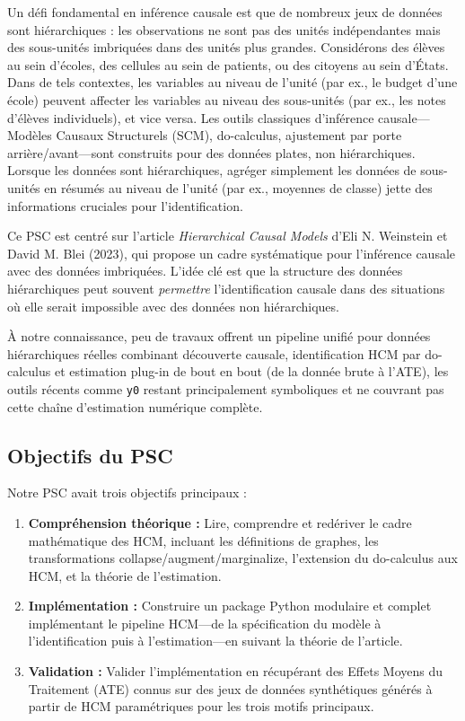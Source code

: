 \documentclass[11pt,a4paper]{article}
\begin{document}
Un défi fondamental en inférence causale est que de nombreux jeux de données sont hiérarchiques : les observations ne sont pas des unités indépendantes mais des sous-unités imbriquées dans des unités plus grandes.
Considérons des élèves au sein d'écoles, des cellules au sein de patients, ou des citoyens au sein d'États.
Dans de tels contextes, les variables au niveau de l'unité (par ex., le budget d'une école) peuvent affecter les variables au niveau des sous-unités (par ex., les notes d'élèves individuels), et vice versa.
Les outils classiques d'inférence causale---Modèles Causaux Structurels (SCM), do-calculus, ajustement par porte arrière/avant---sont construits pour des données plates, non hiérarchiques.
Lorsque les données sont hiérarchiques, agréger simplement les données de sous-unités en résumés au niveau de l'unité (par ex., moyennes de classe) jette des informations cruciales pour l'identification.

Ce PSC est centré sur l'article \emph{Hierarchical Causal Models} d'Eli N. Weinstein et David M. Blei (2023), qui propose un cadre systématique pour l'inférence causale avec des données imbriquées.
L'idée clé est que la structure des données hiérarchiques peut souvent \emph{permettre} l'identification causale dans des situations où elle serait impossible avec des données non hiérarchiques.

À notre connaissance, peu de travaux offrent un pipeline unifié pour données hiérarchiques réelles combinant découverte causale, identification HCM par do-calculus et estimation plug-in de bout en bout (de la donnée brute à l'ATE), les outils récents comme \texttt{y0} restant principalement symboliques et ne couvrant pas cette chaîne d'estimation numérique complète.

\subsection{Objectifs du PSC}

Notre PSC avait trois objectifs principaux :
\begin{enumerate}
  \item \textbf{Compréhension théorique :} Lire, comprendre et redériver le cadre mathématique des HCM, incluant les définitions de graphes, les transformations collapse/augment/marginalize, l'extension du do-calculus aux HCM, et la théorie de l'estimation.
  \item \textbf{Implémentation :} Construire un package Python modulaire et complet implémentant le pipeline HCM---de la spécification du modèle à l'identification puis à l'estimation---en suivant la théorie de l'article.
  \item \textbf{Validation :} Valider l'implémentation en récupérant des Effets Moyens du Traitement (ATE) connus sur des jeux de données synthétiques générés à partir de HCM paramétriques pour les trois motifs principaux.
\end{enumerate}
\end{document}
